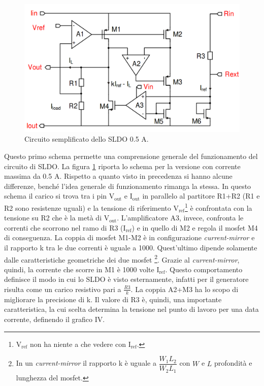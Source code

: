 \begin{figure}[!htbp]
\centering
\includegraphics[scale=.3]{Immagini/SLDO5A}
\caption{Circuito semplificato dello SLDO 0.5 A.}
\label{SLDO5A}
\end{figure}

Questo primo schema permette una comprensione generale del funzionamento del circuito di SLDO. La figura \ref{SLDO5A} riporta lo schema per la versione con corrente massima da 0.5 A.
Rispetto a quanto visto in precedenza si hanno alcune differenze, benché l'idea generale di funzionamento rimanga la stessa. 
In questo schema il carico si trova tra i pin $\mathrm{V_{out}}$ e $\mathrm{I_{out}}$ in parallelo al partitore R1+R2 (R1 e R2 sono resistenze uguali) e la tensione di riferimento $\mathrm{V_{ref}}$\footnote{$\mathrm{V_{ref}}$ non ha niente a che vedere con $\mathrm{I_{ref}}$.} è confrontata con la tensione su R2 che è la metà di $\mathrm{V_{out}}$.
L'amplificatore A3, invece, confronta le correnti che scorrono nel ramo di R3 ($\mathrm{I_{ref}}$) e in quello di M2 e regola il mosfet M4 di conseguenza. 
La coppia di mosfet M1-M2 è in configurazione \textit{current-mirror} e il rapporto k tra le due correnti è uguale a 1000.
Quest'ultimo dipende solamente dalle caratteristiche geometriche dei due mosfet
\footnote{
  In un \textit{current-mirror} il rapporto k è uguale a $\dfrac{W_1L_2}{W_2L_1}$ con $W$ e $L$ profondità e lunghezza del mosfet.
}. 
Grazie al \textit{current-mirror}, quindi, la corrente che scorre in M1 è 1000 volte $\mathrm{I_{ref}}$.
Questo comportamento definisce il modo in cui lo SLDO è visto esternamente, infatti per il generatore risulta come un carico resistivo pari a $\frac{R3}{k}$. 
La coppia A2+M3 ha lo scopo di migliorare la precisione di k. 
Il valore di R3 è, quindi, una importante caratteristica, la cui scelta determina la tensione nel punto di lavoro per una data corrente, definendo il grafico IV. 

